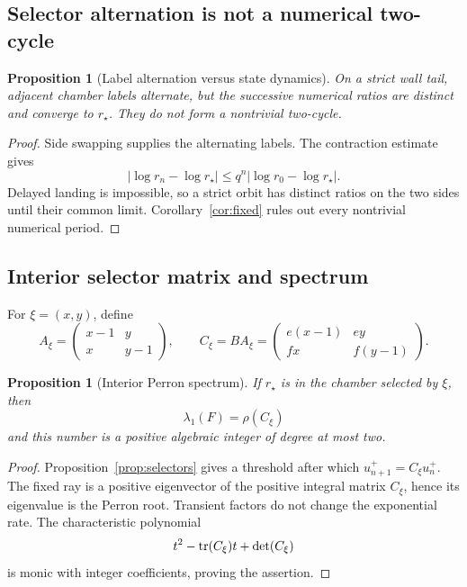 \documentclass[11pt]{article}
\newtheorem{proposition}[theorem]{Proposition}
\theoremstyle{definition}
\theoremstyle{remark}
\begin{document}
\subsection{Selector alternation is not a numerical two-cycle}

\begin{proposition}[Label alternation versus state dynamics]
\label{prop:no-cycle}
On a strict wall tail, adjacent chamber labels alternate, but the
successive numerical ratios are distinct and converge to \(r_\star\).
They do not form a nontrivial two-cycle.
\end{proposition}

\begin{proof}
Side swapping supplies the alternating labels.  The contraction estimate
gives
\[
|\log r_n-\log r_\star|\leq q^n
|\log r_0-\log r_\star|.
\]
Delayed landing is impossible, so a strict orbit has distinct ratios on
the two sides until their common limit.  Corollary~\ref{cor:fixed} rules
out every nontrivial numerical period.
\end{proof}

\subsection{Interior selector matrix and spectrum}

For \(\xi=(x,y)\), define
\[
A_\xi=
\begin{pmatrix}x-1&y\\x&y-1\end{pmatrix},
\qquad
C_\xi=BA_\xi=
\begin{pmatrix}e(x-1)&ey\\fx&f(y-1)\end{pmatrix}.
\]

\begin{proposition}[Interior Perron spectrum]\label{prop:interior-spectrum}
If \(r_\star\) is in the chamber selected by \(\xi\), then
\[
\lambda_1(F)=\rho(C_\xi)
\]
and this number is a positive algebraic integer of degree at most two.
\end{proposition}

\begin{proof}
Proposition~\ref{prop:selectors} gives a threshold after which
\(u^+_{n+1}=C_\xi u^+_n\).  The fixed ray is a positive eigenvector of
the positive integral matrix \(C_\xi\), hence its eigenvalue is the
Perron root.  Transient factors do not change the exponential rate.
The characteristic polynomial
\[
t^2-\operatorname{tr}(C_\xi)t+\det(C_\xi)
\]
is monic with integer coefficients, proving the assertion.
\end{proof}
\end{document}
